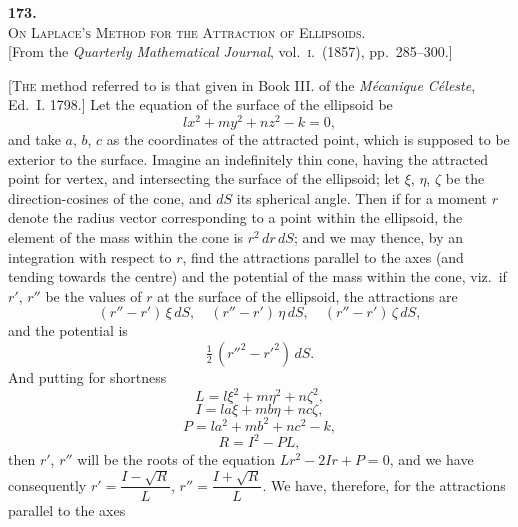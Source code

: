\documentclass[11pt]{article}
\begin{document}
\bigskip

\begin{center}
{\large\textbf{173.}}\\[1em]
{\large\scshape On Laplace's Method for the Attraction of Ellipsoids.}\\[1em]
{\small [From the \textit{Quarterly Mathematical Journal}, vol.~\textsc{i}.\ (1857), pp.~285--300.]}
\end{center}

\bigskip

\textsc{[The} method referred to is that given in Book III. of the \textit{M\'ecanique C\'eleste},
Ed.\ I. 1798.] Let the equation of the surface of the ellipsoid be
\[
l x^{2} + m y^{2} + n z^{2} - k = 0,
\]
and take $a$, $b$, $c$ as the coordinates of the attracted point, which is supposed to be
exterior to the surface. Imagine an indefinitely thin cone, having the attracted point
for vertex, and intersecting the surface of the ellipsoid; let $\xi$, $\eta$, $\zeta$ be the direction-cosines
of the cone, and $dS$ its spherical angle. Then if for a moment $r$ denote the
radius vector corresponding to a point within the ellipsoid, the element of the mass
within the cone is $r^{2}\,dr\,dS$; and we may thence, by an integration with respect to $r$,
find the attractions parallel to the axes (and tending towards the centre) and the
potential of the mass within the cone, viz.\ if $r'$, $r''$ be the values of $r$ at the surface
of the ellipsoid, the attractions are
\[
(r'' - r')\,\xi\,dS,\quad (r'' - r')\,\eta\,dS,\quad (r'' - r')\,\zeta\,dS,
\]
and the potential is
\[
\tfrac{1}{2}\,(r''^{2} - r'^{2})\,dS.
\]
And putting for shortness
\[
L = l\xi^{2} + m\eta^{2} + n\zeta^{2},
\]
\[
I = la\xi + mb\eta + nc\zeta,
\]
\[
P = la^{2} + mb^{2} + nc^{2} - k,
\]
\[
R = I^{2} - PL,
\]
then $r'$, $r''$ will be the roots of the equation $L r^{2} - 2 I r + P = 0$, and we have consequently
$r' = \dfrac{I - \sqrt{R}}{L}$, $r'' = \dfrac{I + \sqrt{R}}{L}$. We have, therefore, for the attractions parallel to the axes
\end{document}
